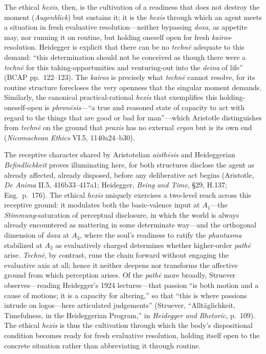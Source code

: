 The ethical \textit{hexis}, then, is the cultivation of a readiness that does not destroy the moment (\textit{Augenblick}) but sustains it; it is the \textit{hexis} through which an agent meets a situation in fresh evaluative resolution---neither bypassing \textit{doxa}, as appetite may, nor running it on routine, but holding oneself open for fresh \textit{kairos}-resolution. Heidegger is explicit that there can be no \textit{technē} adequate to this demand: ``this determination should not be conceived as though there were a \textit{technē} for this taking-opportunities and venturing-out into the \textit{deina} of life'' (BCAP pp.~122--123). The \textit{kairos} is precisely what \textit{technē} cannot resolve, for its routine structure forecloses the very openness that the singular moment demands. Similarly, the canonical practical-rational \textit{hexis} that exemplifies this holding-oneself-open is \textit{phronēsis}---``a true and reasoned state of capacity to act with regard to the things that are good or bad for man''---which Aristotle distinguishes from \textit{technē} on the ground that \textit{praxis} has no external \textit{ergon} but is its own end (\textit{Nicomachean Ethics} VI.5, 1140a24--b30).

The receptive character shared by Aristotelian \textit{aisthēsis} and Heideggerian \textit{Befindlichkeit} proves illuminating here, for both structures disclose the agent as already affected, already disposed, before any deliberative act begins (Aristotle, \textit{De Anima} II.5, 416b33--417a1; Heidegger, \textit{Being and Time}, \S 29, H.137; Eng.~p.~176). The ethical \textit{hexis} uniquely exercises a two-level reach across this receptive ground: it modulates both the basic-valence input at $A_1$---the \textit{Stimmung}-saturation of perceptual disclosure, in which the world is always already encountered as mattering in some determinate way---and the orthogonal dimension of \textit{doxa} at $A_3$, where the soul's readiness to ratify the \textit{phantasma} stabilized at $A_2$ as evaluatively charged determines whether higher-order \textit{pathē} arise. \textit{Technē}, by contrast, runs the chain forward without engaging the evaluative axis at all; hence it neither deepens nor transforms the affective ground from which perception arises. Of the \textit{pathē} more broadly, Struever observes---reading Heidegger's 1924 lectures---that passion ``is both motion and a cause of motions; it is a capacity for altering,'' so that ``this is where passions intrude on logos---here articulated judgements'' (Struever, ``Alltäglichkeit, Timefulness, in the Heideggerian Program,'' in \textit{Heidegger and Rhetoric}, p.~109). The ethical \textit{hexis} is thus the cultivation through which the body's dispositional condition becomes ready for fresh evaluative resolution, holding itself open to the concrete situation rather than abbreviating it through routine.

